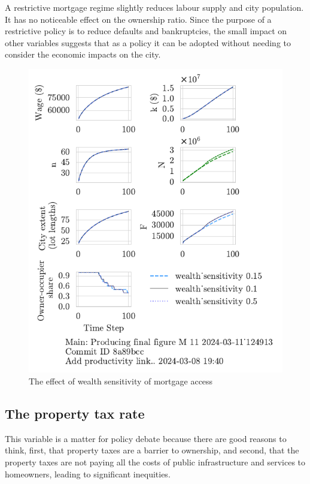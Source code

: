 A restrictive mortgage regime slightly reduces labour supply and city population. It has no noticeable effect on the ownership ratio. Since the purpose of a restrictive policy is to reduce defaults and bankruptcies, the small impact on other variables suggests that as a policy it can be adopted without needing to consider the  economic impacts on the city. 

\begin{figure}[h!bt]
    \centering
    \includegraphics[scale=.8, trim={0 1.4cm 0 0},clip]{fig/wealth_sensitivity-124913.pdf}
    \caption{The effect of wealth sensitivity of mortgage access}
    \label{fig:wealth_sensitivity_ownership_trajectory}
\end{figure}

\newpage

\subsection{The property tax rate}

This variable is a matter for policy debate because there are good reasons to think, first, that property taxes are a barrier to ownership, and second, that the property taxes are not paying all the costs of public infrastructure and services to homeowners, leading to significant inequities.

